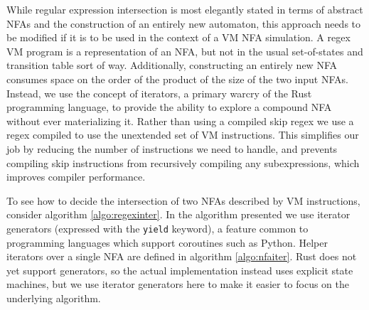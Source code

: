 While regular expression intersection is most elegantly stated
in terms of abstract NFAs and the construction of an entirely
new automaton, this approach needs to be modified if it is
to be used in the context of a VM NFA simulation. A regex
VM program is a representation of an NFA, but not in the usual
set-of-states and transition
table sort of way. Additionally, constructing an entirely
new NFA consumes space on the order of the product of the
size of the two input NFAs. Instead, we use the concept of
iterators, a primary warcry of the Rust programming language,
to provide the ability to explore a compound NFA without
ever materializing it. Rather than using a compiled
skip regex we use a regex compiled to use the unextended
set of VM instructions. This simplifies our job by reducing
the number of instructions we need to handle, and prevents
compiling skip instructions from recursively compiling any
subexpressions, which improves compiler performance.

To see how to decide the intersection of two NFAs described
by VM instructions, consider algorithm \ref{algo:regexinter}.
In the algorithm presented we use iterator generators
(expressed with the \verb'yield' keyword),
a feature common to programming languages which support coroutines
such as Python. Helper iterators over a single NFA are defined
in algorithm \ref{algo:nfaiter}. Rust does not yet support generators, so the
actual implementation instead uses explicit state machines, but
we use iterator generators here to make it easier to focus on the underlying
algorithm.

